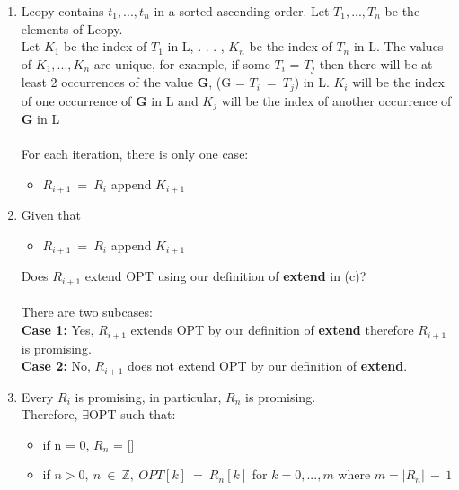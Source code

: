 \documentclass[11pt,twoside]{article}
\begin{document}
\begin{enumerate}[leftmargin=0pt,label=(\alph*)]
\item Lcopy contains $t_{1},...,t_{n}$ in a sorted ascending order. Let $T_{1},...,T_{n}$ be the elements of Lcopy.\\
Let $K_{1}$ be the index of $T_{1}$ in L, . . . , $K_{n}$ be the index of $T_{n}$ in L. The values of $K_{1},...,K_{n}$ are unique, for example, if some $T_{i}$ = $T_{j}$ then there will be at least 2 occurrences of the value {\bf G}, (G = $T_{i}\ =\ T_{j}$) in L. $K_{i}$ will be the index of one occurrence of {\bf G} in L and $K_{j}$ will be the index of another occurrence of {\bf G} in L\\\\
For each iteration, there is only one case:
    \begin{itemize}
    \item $R_{i+1}\ =\ R_{i}$ append $K_{i+1}$
    \end{itemize}
\newpage
\item Given that 
\begin{itemize}
\item $R_{i+1}\ =\ R_{i}$ append $K_{i+1}$
\end{itemize}
Does $R_{i+1}$ extend OPT using our definition of {\bf extend} in (c)?\\\\
There are two subcases:\\
{\bf Case 1:} Yes, $R_{i+1}$ extends OPT by our definition of {\bf extend} therefore $R_{i+1}$ is promising.\\
{\bf Case 2:} No, $R_{i+1}$ does not extend OPT by our definition of {\bf extend}.
\item Every $R_{i}$ is promising, in particular, $R_{n}$ is promising.\\
Therefore, $\exists$OPT such that:
    \begin{itemize}
    \item if n = 0, $R_{n}$ = []
    \item if $n>0,\ n\ \in\ \mathbb{Z},\ OPT[k]\ =\ R_{n}[k]$ for $k=0,...,m$ where $m=|R_{n}|\ -\ 1$
    \end{itemize}
\end{enumerate}
\end{document}
